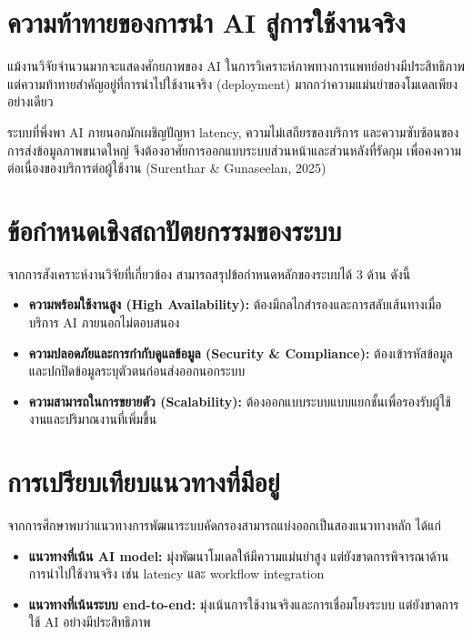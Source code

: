 \section{ความท้าทายของการนำ AI สู่การใช้งานจริง}

แม้งานวิจัยจำนวนมากจะแสดงศักยภาพของ AI
ในการวิเคราะห์ภาพทางการแพทย์อย่างมีประสิทธิภาพ
แต่ความท้าทายสำคัญอยู่ที่การนำไปใช้งานจริง (deployment)
มากกว่าความแม่นยำของโมเดลเพียงอย่างเดียว

ระบบที่พึ่งพา AI ภายนอกมักเผชิญปัญหา latency,
ความไม่เสถียรของบริการ และความซับซ้อนของการส่งข้อมูลภาพขนาดใหญ่
จึงต้องอาศัยการออกแบบระบบส่วนหน้าและส่วนหลังที่รัดกุม
เพื่อคงความต่อเนื่องของบริการต่อผู้ใช้งาน (Surenthar \& Gunaseelan, 2025)

\section{ข้อกำหนดเชิงสถาปัตยกรรมของระบบ}

จากการสังเคราะห์งานวิจัยที่เกี่ยวข้อง สามารถสรุปข้อกำหนดหลักของระบบได้ 3 ด้าน ดังนี้

\begin{itemize}
  \item \textbf{ความพร้อมใช้งานสูง (High Availability):}
  ต้องมีกลไกสำรองและการสลับเส้นทางเมื่อบริการ AI ภายนอกไม่ตอบสนอง
  \item \textbf{ความปลอดภัยและการกำกับดูแลข้อมูล (Security \& Compliance):}
  ต้องเข้ารหัสข้อมูลและปกปิดข้อมูลระบุตัวตนก่อนส่งออกนอกระบบ
  \item \textbf{ความสามารถในการขยายตัว (Scalability):}
  ต้องออกแบบระบบแบบแยกชั้นเพื่อรองรับผู้ใช้งานและปริมาณงานที่เพิ่มขึ้น
\end{itemize}
 
\section{การเปรียบเทียบแนวทางที่มีอยู่}

จากการศึกษาพบว่าแนวทางการพัฒนาระบบคัดกรองสามารถแบ่งออกเป็นสองแนวทางหลัก ได้แก่

\begin{itemize}
  \item \textbf{แนวทางที่เน้น AI model:}
  มุ่งพัฒนาโมเดลให้มีความแม่นยำสูง
  แต่ยังขาดการพิจารณาด้านการนำไปใช้งานจริง เช่น latency และ workflow integration

  \item \textbf{แนวทางที่เน้นระบบ end-to-end:}
  มุ่งเน้นการใช้งานจริงและการเชื่อมโยงระบบ
  แต่ยังขาดการใช้ AI อย่างมีประสิทธิภาพ
\end{itemize}

